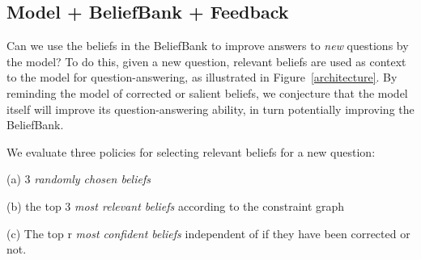 \documentclass[11pt]{article}
\newcommand{\eat}[1]{}
\newenvironment{des}{                 %
     \parskip 0cm \begin{list}{}{\parsep 0cm \itemsep 0cm \topsep 0cm}}{
       \end{list}} %
\begin{document}

\subsection{Model + BeliefBank + Feedback}

Can we use the beliefs in the BeliefBank to improve answers to {\it new} questions by the model?
To do this, given a new question, relevant beliefs are used as 
context to the model for question-answering, as illustrated in Figure~\ref{architecture}. 
By reminding the model of corrected or salient beliefs, we conjecture that the model itself
will improve its question-answering ability, in turn potentially improving the
BeliefBank.

We evaluate three policies for selecting relevant beliefs for a new question:
\begin{des}
\item[(a)] 3 {\it randomly chosen beliefs}
\item[(b)] the top 3 {\it most relevant beliefs} according to the constraint graph
\item[(c)] The top r {\it most confident beliefs} independent of if they have been corrected or not.
\end{des}

\eat{
Baselines:
\begin{des}
\item[(a)] 3 random beliefs of the model without SAT: works better than bm25 as it has more variety in what it adds whereas bm25 if no good match is found add always the same unhelpful context.
\item[(b)] The top 3 beliefs most similar to the question, as identified by BM25 (information retrieval) without SAT: see (a)
\item[(c)] 3 random beliefs of the belief bank after SAT.
\item[(d)] 3 most confident assertions according to the constraints: This works if the relevant queries have been already asked, if not it has the same problem as bm25 as it then adds always the same unfortunate context.
\end{des}}
\end{document}
